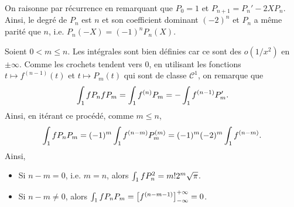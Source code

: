 \begin{solution}
\begin{reponses}
\item On raisonne par récurrence en remarquant que $P_0 = 1$ et $P_{n+1} = P_n' - 2 X P_n$. Ainsi, le degré de $P_n$ est $n$ et son coefficient dominant $(-2)^n$ et $P_n$ a même parité que $n$, i.e. $P_n(-X) = (-1)^n P_n(X)$.

\item Soient $0 < m \leq n$. Les intégrales sont bien définies car ce sont des $o(1/x^2)$ en $\pm\infty$. Comme les crochets tendent vers $0$, en utilisant les fonctions $t \mapsto f^{(n-1)}(t)$ et $t \mapsto P_m(t)$ qui sont de classe $\mathscr{C}^1$, on remarque que
\[
\int_1 f P_n f P_m = \int_1 f^{(n)} P_m = -\int_1 f^{(n-1)} P_m'.
\]
Ainsi, en itérant ce procédé, comme $m \leq n$,
\[
\int_1 f P_n P_m = (-1)^m \int_1 f^{(n-m)} P_m^{(m)}
= (-1)^m (-2)^m \int_1 f^{(n-m)}.
\]
Ainsi,
\begin{itemize}
\item Si $n - m = 0$, i.e. $m = n$, alors $\int_1 f P_n^2 = m! 2^m \sqrt{\pi}$.
\item Si $n - m \neq 0$, alors $\int_1 f P_n P_m = \left[f^{(n-m-1)}\right]_{-\infty}^{+\infty} = 0$.
\end{itemize}
\end{reponses}
\end{solution}